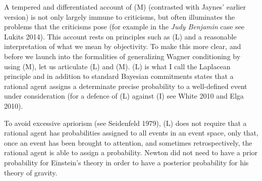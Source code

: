 \documentclass[11pt]{article}
\begin{document}
A tempered and differentiated account of (M) (contrasted with Jaynes'
earlier version) is not only largely immune to criticisms, but often
illuminates the problems that the criticisms pose (for example in the
\emph{Judy Benjamin} case see Lukits 2014). This account
rests on principles such as (L) and a reasonable interpretation of
what we mean by objectivity. To make this more clear, and before we
launch into the formalities of generalizing Wagner conditioning by
using (M), let us articulate (L) and (M). (L) is what I call the
Laplacean principle and in addition to standard Bayesian commitments
states that a rational agent assigns a determinate precise probability
to a well-defined event under consideration (for a defence of (L)
against (I) see White 2010 and Elga 2010). 




To avoid excessive apriorism (see Seidenfeld 1979), (L)
does not require that a rational agent has probabilities assigned to
all events in an event space, only that, once an event has been
brought to attention, and sometimes retrospectively, the rational
agent is able to assign a probability. Newton did not need to have a
prior probability for Einstein's theory in order to have a posterior
probability for his theory of gravity.
\end{document}
